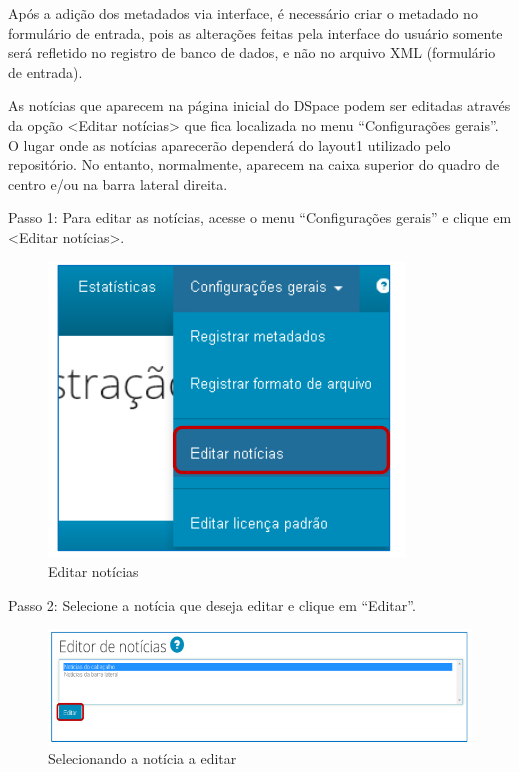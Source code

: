 \documentclass[12pt,hidelinks]{article}
\begin{document}
    Após a adição dos metadados via interface, é necessário criar o metadado no formulário de entrada, pois as alterações feitas pela interface do usuário somente será refletido no registro de banco de dados, e não no arquivo XML (formulário de entrada).
    
\newpage
    
    As notícias que aparecem na página inicial do DSpace podem ser editadas através da opção <Editar notícias> que fica localizada no menu “Configurações gerais”. O lugar onde as notícias aparecerão dependerá do layout1 utilizado pelo repositório. No entanto, normalmente, aparecem na caixa superior do quadro de centro e/ou na barra lateral direita.
    
    \singlespacing
    
    Passo 1: Para editar as notícias, acesse o menu “Configurações gerais” e clique em <Editar notícias>.
    
    \begin{figure}[!htp]
                \centering
                \includegraphics[scale=0.8]{figura/Figura129.png}
                \caption{Editar notícias}
            \label{Rotulo}
        \end{figure}
    
    Passo 2: Selecione a notícia que deseja editar e clique em “Editar”.
    
    \begin{figure}[!htp]
                \centering
                \includegraphics[scale=0.8]{figura/Figura130.png}
                \caption{Selecionando a notícia a editar}
            \label{Rotulo}
        \end{figure}
    
\end{document}
